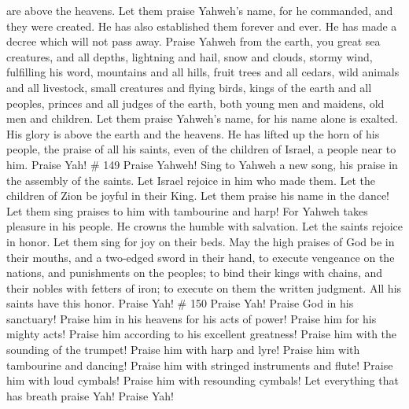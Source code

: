 are above the heavens.  Let them praise Yahweh's name, for
he commanded, and they were created.  He has also
established them forever and ever. He has made a decree which will not
pass away.  Praise Yahweh from the earth, you great sea
creatures, and all depths,  lightning and hail, snow and
clouds, stormy wind, fulfilling his word,  mountains and all
hills, fruit trees and all cedars,  wild animals and all
livestock, small creatures and flying birds,  kings of the
earth and all peoples, princes and all judges of the earth,
 both young men and maidens, old men and children.
 Let them praise Yahweh's name, for his name alone is
exalted. His glory is above the earth and the heavens.  He
has lifted up the horn of his people, the praise of all his saints, even
of the children of Israel, a people near to him. Praise Yah! \# 149
 Praise Yahweh! Sing to Yahweh a new song, his praise in the
assembly of the saints.  Let Israel rejoice in him who made
them. Let the children of Zion be joyful in their King.  Let
them praise his name in the dance! Let them sing praises to him with
tambourine and harp!  For Yahweh takes pleasure in his
people. He crowns the humble with salvation.  Let the saints
rejoice in honor. Let them sing for joy on their beds.  May
the high praises of God be in their mouths, and a two-edged sword in
their hand,  to execute vengeance on the nations, and
punishments on the peoples;  to bind their kings with
chains, and their nobles with fetters of iron;  to execute
on them the written judgment. All his saints have this honor. Praise
Yah! \# 150  Praise Yah! Praise God in his sanctuary! Praise
him in his heavens for his acts of power!  Praise him for
his mighty acts! Praise him according to his excellent greatness!
 Praise him with the sounding of the trumpet! Praise him
with harp and lyre!  Praise him with tambourine and dancing!
Praise him with stringed instruments and flute!  Praise him
with loud cymbals! Praise him with resounding cymbals!  Let
everything that has breath praise Yah! Praise Yah!
